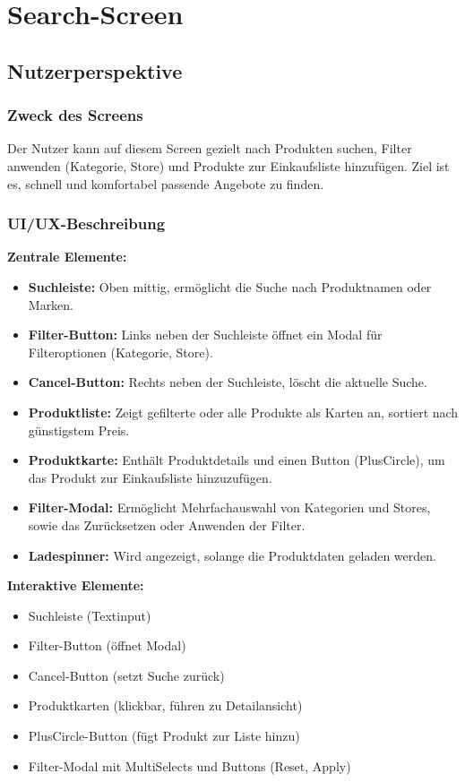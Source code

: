 \documentclass[12pt, a4paper]{report} %
\begin{document}
\section{Search-Screen}
\label{sec:search_screen}

\subsection{Nutzerperspektive}

\subsubsection{Zweck des Screens}
Der Nutzer kann auf diesem Screen gezielt nach Produkten suchen, Filter anwenden (Kategorie, Store) und Produkte zur Einkaufsliste hinzufügen. Ziel ist es, schnell und komfortabel passende Angebote zu finden.

\subsubsection{UI/UX-Beschreibung}

\textbf{Zentrale Elemente:}
\begin{itemize}
    \item \textbf{Suchleiste:} Oben mittig, ermöglicht die Suche nach Produktnamen oder Marken.
    \item \textbf{Filter-Button:} Links neben der Suchleiste öffnet ein Modal für Filteroptionen (Kategorie, Store).
    \item \textbf{Cancel-Button:} Rechts neben der Suchleiste, löscht die aktuelle Suche.
    \item \textbf{Produktliste:} Zeigt gefilterte oder alle Produkte als Karten an, sortiert nach günstigstem Preis.
    \item \textbf{Produktkarte:} Enthält Produktdetails und einen Button (PlusCircle), um das Produkt zur Einkaufsliste hinzuzufügen.
    \item \textbf{Filter-Modal:} Ermöglicht Mehrfachauswahl von Kategorien und Stores, sowie das Zurücksetzen oder Anwenden der Filter.
    \item \textbf{Ladespinner:} Wird angezeigt, solange die Produktdaten geladen werden.
\end{itemize}

\noindent\textbf{Interaktive Elemente:}
\begin{itemize}
    \item Suchleiste (Textinput)
    \item Filter-Button (öffnet Modal)
    \item Cancel-Button (setzt Suche zurück)
    \item Produktkarten (klickbar, führen zu Detailansicht)
    \item PlusCircle-Button (fügt Produkt zur Liste hinzu)
    \item Filter-Modal mit MultiSelects und Buttons (Reset, Apply)
\end{itemize}
\end{document}
